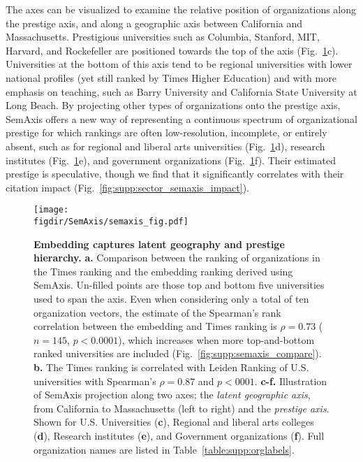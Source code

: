 \documentclass[12pt]{article} %
\def\figdir{../Figs}
\begin{document}
The axes can be visualized to examine the relative position of organizations along the prestige axis, and along a geographic axis between California and Massachusetts.
Prestigious universities such as Columbia, Stanford, MIT, Harvard, and Rockefeller are positioned towards the top of the axis (Fig.~\ref{fig:semaxis}c).
Universities at the bottom of this axis tend to be regional universities with lower national profiles (yet still ranked by Times Higher Education) and with more emphasis on teaching, such as Barry University and California State University at Long Beach.
By projecting other types of organizations onto the prestige axis, SemAxis offers a new way of representing a continuous spectrum of organizational prestige for which rankings are often low-resolution, incomplete, or entirely absent, such as for regional and liberal arts universities (Fig.~\ref{fig:semaxis}d), research institutes (Fig.~\ref{fig:semaxis}e), and government organizations (Fig.~\ref{fig:semaxis}f).
Their estimated prestige is speculative, though we find that it significantly correlates with their citation impact (Fig.~\ref{fig:supp:sector_semaxis_impact}).


%
%
\begin{figure}[hp!]
	\centering
	\texttt{[image: \\figdir/SemAxis/semaxis\_fig.pdf]}
	\caption{
		\textbf{Embedding captures latent geography and prestige hierarchy.}
		\textbf{a.} Comparison between the ranking of organizations in the Times ranking and the embedding ranking derived using SemAxis.
		Un-filled points are those top and bottom five universities used to span the axis.
		Even when considering only a total of ten organization vectors, the estimate of the Spearman's rank correlation between the embedding and Times ranking is $\rho = 0.73$ ($n = 145$, $p < 0.0001$), which increases when more top-and-bottom ranked universities are included (Fig.~\ref{fig:supp:semaxis_compare}).
		\textbf{b.} The Times ranking is correlated with Leiden Ranking of U.S. universities with Spearman's $\rho = 0.87$ and $p < 0001$.
		\textbf{c-f.} Illustration of SemAxis projection along two axes;  the \textit{latent geographic axis}, from California to Massachusetts (left to right) and the \textit{prestige axis}.
		Shown for U.S. Universities (\textbf{c}), Regional and liberal arts colleges (\textbf{d}), Research institutes (\textbf{e}), and Government organizations (\textbf{f}).
		Full organization names are listed in Table~\ref{table:supp:orglabels}.
	}
	\label{fig:semaxis}
\end{figure}
\end{document}
